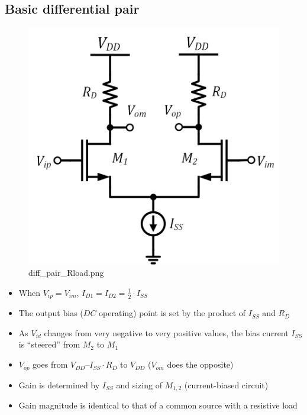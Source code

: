 \documentclass[11pt]{article}
\begin{document}
    \hypertarget{basic-differential-pair}{%
\subsection{Basic differential pair}\label{basic-differential-pair}}

    \begin{figure}
\centering
\includegraphics{diff_pair_Rload.png}
\caption{diff\_pair\_Rload.png}
\end{figure}

    \begin{itemize}
\item
  When \(V_{ip} = V_{im}\),
  \(I_{D1} = I_{D2} = \frac{1}{2} \cdot I_{SS}\)
\item
  The output bias (\(DC\) operating) point is set by the product of
  \(I_{SS}\) and \(R_D\)
\item
  As \(V_{id}\) changes from very negative to very positive values, the
  bias current \(I_{SS}\) is ``steered'' from \(M_2\) to \(M_1\)
\item
  \(V_{op}\) goes from \(V_{DD} – I_{SS} \cdot R_D\) to \(V_{DD}\)
  (\(V_{om}\) does the opposite)
\item
  Gain is determined by \(I_{SS}\) and sizing of \(M_{1,2}\)
  (current-biased circuit)
\item
  Gain magnitude is identical to that of a common source with a
  resistive load
\end{itemize}
\end{document}
